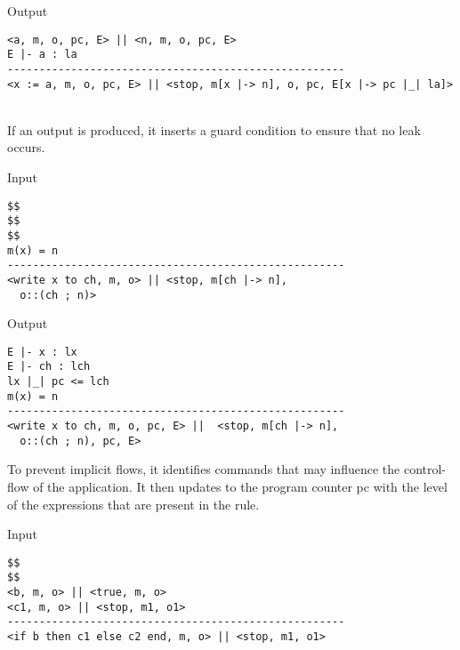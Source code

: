 \documentclass[final]{beamer}
\newlength{\twocolwid}
\begin{document}
\begin{frame}[fragile]
\begin{columns}[t]
\begin{column}{\twocolwid}
\begin{minipage}[t]{0.48\linewidth}
\end{minipage}
\hfill%
\begin{minipage}[t]{0.48\linewidth}
\begin{alertblock}{Output}
\begin{lstlisting}
<a, m, o, pc, E> || <n, m, o, pc, E>
E |- a : la
-----------------------------------------------------
<x := a, m, o, pc, E> || <stop, m[x |-> n], o, pc, E[x |-> pc |_| la]>
\end{lstlisting}
\end{alertblock}
\end{minipage}\\
\color{black}
If an output is produced, it inserts a guard condition to ensure that no leak occurs.
\noindent
\begin{minipage}[t]{0.48\linewidth}
\begin{alertblock}{Input}
\begin{lstlisting}
$$
$$
$$
m(x) = n
-----------------------------------------------------
<write x to ch, m, o> || <stop, m[ch |-> n], 
  o::(ch ; n)>
\end{lstlisting}        
\end{alertblock}
\end{minipage}
\hfill%
\begin{minipage}[t]{0.48\linewidth}
\begin{alertblock}{Output}
\begin{lstlisting}
E |- x : lx
E |- ch : lch
lx |_| pc <= lch
m(x) = n
-----------------------------------------------------
<write x to ch, m, o, pc, E> ||  <stop, m[ch |-> n], 
  o::(ch ; n), pc, E>
\end{lstlisting}
\end{alertblock}
\end{minipage}

\color{black}
To prevent implicit flows, it identifies commands that may influence the control-flow of the application. It then updates to the program counter pc with the level of the expressions that are present in the rule.\\
\noindent
\begin{minipage}[t]{0.48\linewidth}
\begin{alertblock}{Input}
\begin{lstlisting}
$$
$$
<b, m, o> || <true, m, o>
<c1, m, o> || <stop, m1, o1>
-----------------------------------------------------
<if b then c1 else c2 end, m, o> || <stop, m1, o1>





\end{lstlisting}
\end{alertblock}
\end{minipage}
\end{column}
\end{columns}
\end{frame}
\end{document}
